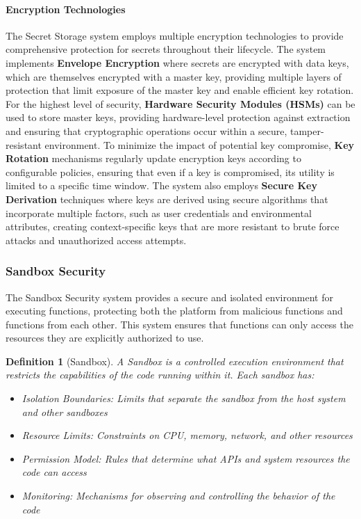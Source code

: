 \documentclass[11pt]{article}
\newtheorem{definition}{Definition}
\begin{document}
\paragraph{Encryption Technologies}
The Secret Storage system employs multiple encryption technologies to provide comprehensive protection for secrets throughout their lifecycle. The system implements \textbf{Envelope Encryption} where secrets are encrypted with data keys, which are themselves encrypted with a master key, providing multiple layers of protection that limit exposure of the master key and enable efficient key rotation. For the highest level of security, \textbf{Hardware Security Modules (HSMs)} can be used to store master keys, providing hardware-level protection against extraction and ensuring that cryptographic operations occur within a secure, tamper-resistant environment. To minimize the impact of potential key compromise, \textbf{Key Rotation} mechanisms regularly update encryption keys according to configurable policies, ensuring that even if a key is compromised, its utility is limited to a specific time window. The system also employs \textbf{Secure Key Derivation} techniques where keys are derived using secure algorithms that incorporate multiple factors, such as user credentials and environmental attributes, creating context-specific keys that are more resistant to brute force attacks and unauthorized access attempts.

\subsubsection{Sandbox Security}
\label{subsubsec:sandbox}

The Sandbox Security system provides a secure and isolated environment for executing functions, protecting both the platform from malicious functions and functions from each other. This system ensures that functions can only access the resources they are explicitly authorized to use.



\begin{definition}[Sandbox]
A Sandbox is a controlled execution environment that restricts the capabilities of the code running within it. Each sandbox has:
\begin{itemize}
    \item Isolation Boundaries: Limits that separate the sandbox from the host system and other sandboxes
    \item Resource Limits: Constraints on CPU, memory, network, and other resources
    \item Permission Model: Rules that determine what APIs and system resources the code can access
    \item Monitoring: Mechanisms for observing and controlling the behavior of the code
\end{itemize}
\end{definition}
\end{document}
